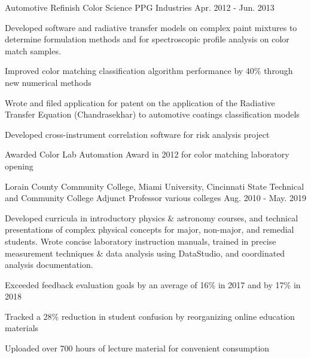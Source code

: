 \begin{cventries}
  \cventry
    {Automotive Refinish} %
    {Color Science} %
    {PPG Industries} %
    {Apr. 2012 - Jun. 2013} %
    {
      \begin{cvparagraph}
        Developed software and radiative transfer models on complex paint mixtures to determine formulation methods and for spectroscopic profile analysis on color match samples.
      \end{cvparagraph}
      \begin{cvitems} %
        \item {Improved color matching classification algorithm performance by 40\% through new numerical methods}
        \item {Wrote and filed application for patent on the application of the Radiative Transfer Equation (Chandrasekhar) to automotive coatings classification models}
        \item {Developed cross-instrument correlation software for risk analysis project}
        \item {Awarded Color Lab Automation Award in 2012 for color matching laboratory opening}
      \end{cvitems}
    }

  \cventry
    {Lorain County Community College, Miami University, Cincinnati State Technical and Community College} %
    {Adjunct Professor} %
    {various colleges} %
    {Aug. 2010 - May. 2019} %
    {
      \begin{cvparagraph}
        Developed curricula in introductory physics \& astronomy courses, and technical presentations of complex physical concepts for major, non-major, and remedial students.  Wrote concise laboratory instruction manuals, trained in precise measurement techniques \& data analysis using DataStudio, and coordinated analysis documentation.
      \end{cvparagraph}
      \begin{cvitems} %
        \item {Exceeded feedback evaluation goals by an average of 16\% in 2017 and by 17\% in 2018}
        \item {Tracked a 28\% reduction in student confusion by reorganizing online education materials}
        \item {Uploaded over 700 hours of lecture material for convenient consumption}
      \end{cvitems}
    }


\end{cventries}
